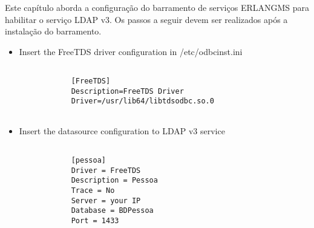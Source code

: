 Este capítulo aborda a configuração do barramento de serviços ERLANGMS 
para habilitar o serviço LDAP v3. Os
passos a seguir devem ser realizados após a instalação do barramento.

\begin{itemize}


	\item  Insert the FreeTDS driver configuration in /etc/odbcinst.ini 

	
		\renewcommand{\lstlistingname}{Código}             
		\begin{lstlisting}[Adding Erlang repository entry, label=freetds_config] 

			[FreeTDS]
			Description=FreeTDS Driver
			Driver=/usr/lib64/libtdsodbc.so.0
			
		\end{lstlisting}	

	
	\item  Insert the datasource configuration to LDAP v3 service
	
		\renewcommand{\lstlistingname}{Código}             
		\begin{lstlisting}[Adding Erlang repository entry, label=datasource_config] 

			[pessoa]
			Driver = FreeTDS
			Description = Pessoa
			Trace = No
			Server = your IP
			Database = BDPessoa
			Port = 1433			

		\end{lstlisting}	
	
	
\end{itemize}

